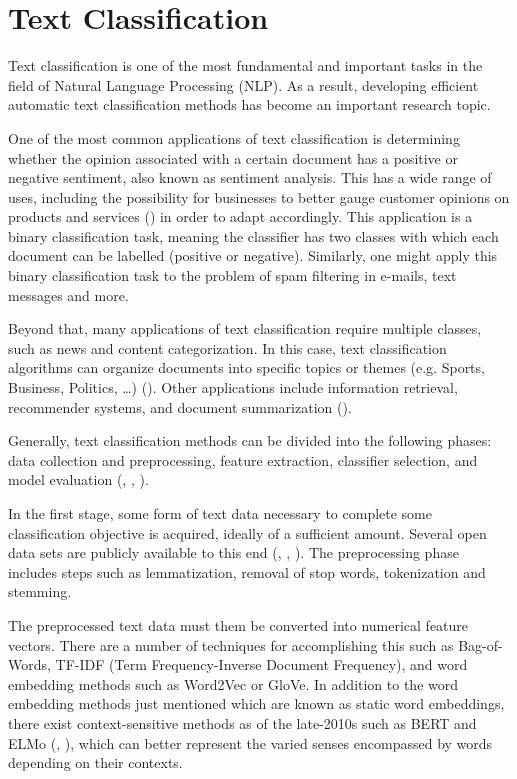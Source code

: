 \documentclass[english,bachelor,ul]{webisthesis} %
\begin{document}
\section{Text Classification}

Text classification is one of the most fundamental and important tasks in the field of Natural Language Processing (NLP). As a result, developing efficient automatic text classification methods has become an important research topic. 

One of the most common applications of text classification is determining whether the opinion associated with a certain document has a positive or negative sentiment, also known as sentiment analysis. This has a wide range of uses, including the possibility for businesses to better gauge customer opinions on products and services (\cite{DBLP:books/sp/mining2012/LiuZ12}) in order to adapt accordingly. This application is a binary classification task, meaning the classifier has two classes with which each document can be labelled (positive or negative). Similarly, one might apply this binary classification task to the problem of spam filtering in e-mails, text messages and more. 

Beyond that, many applications of text classification require multiple classes, such as news and content categorization. In this case, text classification algorithms can organize documents into specific topics or themes (e.g. Sports, Business, Politics, \dots) (\cite{DBLP:journals/csur/Sebastiani02}). Other applications include information retrieval, recommender systems, and document summarization (\cite{DBLP:journals/information/KowsariMHMBB19}).

Generally, text classification methods can be divided into the following phases: data collection and preprocessing, feature extraction, classifier selection, and model evaluation (\cite{DBLP:journals/information/KowsariMHMBB19}, \cite{DBLP:journals/eswa/MironczukP18}, \cite{ikonomakis2005text}).

In the first stage, some form of text data necessary to complete some classification objective is acquired, ideally of a sufficient amount. Several open data sets are publicly available to this end (\cite{DBLP:conf/acl/PangL05}, \cite{DBLP:conf/nips/ZhangZL15}, \cite{DBLP:journals/nle/LiR06}). The preprocessing phase includes steps such as lemmatization, removal of stop words, tokenization and stemming. 

The preprocessed text data must them be converted into numerical feature vectors. There are a number of techniques for accomplishing this such as Bag-of-Words, TF-IDF (Term Frequency-Inverse Document Frequency), and word embedding methods such as Word2Vec or GloVe. In addition to the word embedding methods just mentioned which are known as static word embeddings, there exist context-sensitive methods as of the late-2010s such as BERT and ELMo (\cite{DBLP:conf/naacl/DevlinCLT19}, \cite{DBLP:conf/naacl/PetersNIGCLZ18}), which can better represent the varied senses encompassed by words depending on their contexts.
\end{document}
